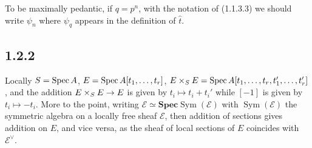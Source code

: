 \documentclass[deligne.tex]{subfiles}
\begin{document}
To be maximally pedantic, if $q=p^n$, with the 
notation of (1.1.3.3) we should write $\psi_n$ where $\psi_q$ appears in
the definition of $\hat t$.

\subsection*{1.2.2} Locally $S=\operatorname{Spec} A$,
$E=\operatorname{Spec} A[t_1,\ldots,t_r]$,
$E\times_S E=\operatorname{Spec} A[t_1,\ldots,t_r,t_1',\ldots,t_r']$, and the addition
$E\times_S E\rightarrow E$ is given by $t_i\mapsto t_i+t_i'$ while $[-1]$ is given
by $t_i\mapsto-t_i$. More to the point, writing
$\mathscr E\simeq\textbf{Spec}\operatorname{Sym}(\mathscr E)$ with
$\operatorname{Sym}(\mathscr E)$ the symmetric algebra on a locally free
sheaf $\mathscr E$, then addition of sections gives addition on $E$, and
vice versa, as the sheaf of local sections of $E$ coincides with
$\mathscr E^\vee$.
\end{document}
